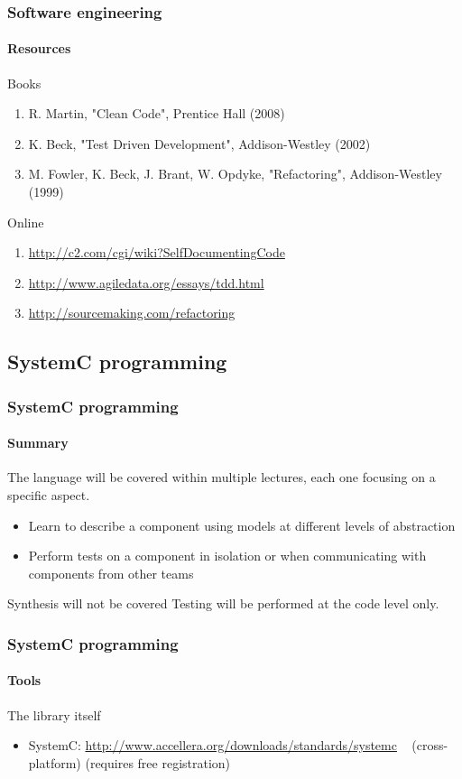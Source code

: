 \begin{frame}
\frametitle{Software engineering}
\framesubtitle{Resources}
\begin{block}{Books}
\begin{enumerate}
\item R. Martin, "Clean Code", Prentice Hall (2008)
\item K. Beck, "Test Driven Development", Addison-Westley (2002)
\item M. Fowler, K. Beck, J. Brant, W. Opdyke, "Refactoring", Addison-Westley (1999)
\end{enumerate}
\end{block}

\begin{block}{Online}
\begin{enumerate}
\item \url{http://c2.com/cgi/wiki?SelfDocumentingCode}
\item \url{http://www.agiledata.org/essays/tdd.html}
\item \url{http://sourcemaking.com/refactoring}
\end{enumerate}
\end{block}

\end{frame}

\subsection{SystemC programming}

\begin{frame}
\frametitle{SystemC programming}
\framesubtitle{Summary}
The language will be covered within multiple lectures, each one focusing on a specific aspect.
\begin{itemize}
\item Learn to describe a component using models at different levels of abstraction
\item Perform tests on a component in isolation or when communicating with components from other teams
\end{itemize}

\pause
\begin{block}{Synthesis will not be covered}
Testing will be performed at the code level only.
\end{block}
\end{frame}

\begin{frame}
\frametitle{SystemC programming}
\framesubtitle{Tools}

\begin{block}{The library itself}
\begin{itemize}
\item SystemC: \url{http://www.accellera.org/downloads/standards/systemc} \,\,\, (cross-platform) (requires free registration)
\end{itemize}
\end{block}

\end{frame}

